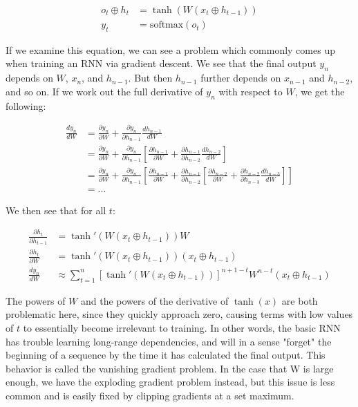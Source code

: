 \begin{align}
    o_t\oplus h_t&=\tanh(W(x_t\oplus h_{t-1})) \\
    y_t&=\text{softmax}(o_t)
\end{align}

If we examine this equation, we can see a problem which commonly comes up when training an RNN via gradient descent. We see that the final output $y_n$ depends on $W$, $x_n$, and $h_{n-1}$. But then $h_{n-1}$ further depends on $x_{n-1}$ and $h_{n-2}$, and so on. If we work out the full derivative of $y_n$ with respect to $W$, we get the following:

\begin{align}
    \frac{dy_n}{dW}&=\frac{\partial y_n}{\partial W} + \frac{\partial y_n}{\partial h_{n-1}}\frac{dh_{n-1}}{dW} \\
    &=\frac{\partial y_n}{\partial W} + \frac{\partial y_n}{\partial h_{n-1}}[\frac{\partial h_{n-1}}{\partial W} + \frac{\partial h_{n-1}}{\partial h_{n-2}}\frac{dh_{n-2}}{dW}] \\
    &=\frac{\partial y_n}{\partial W} + \frac{\partial y_n}{\partial h_{n-1}}[\frac{\partial h_{n-1}}{\partial W} + \frac{\partial h_{n-1}}{\partial h_{n-2}}[
    \frac{\partial h_{n-2}}{\partial W} + \frac{\partial h_{n-2}}{\partial h_{n-3}}\frac{dh_{n-3}}{dW}
    ]] \\
    &=... \nonumber
\end{align}

We then see that for all $t$:

\begin{align}
    \frac{\partial h_t}{\partial h_{t-1}} &= \tanh'(W(x_t\oplus h_{t-1}))W \\
    \frac{\partial h_t}{\partial W} &= \tanh'(W(x_t\oplus h_{t-1}))(x_t\oplus h_{t-1}) \\
    \frac{dy_n}{dW} &\approx \sum_{t=1}^{n} [\tanh'(W(x_t\oplus h_{t-1}))]^{n+1-t}W^{n-t}(x_t\oplus h_{t-1})
\end{align}

The powers of $W$ and the powers of the derivative of $\tanh(x)$ are both problematic here, since they quickly approach zero, causing terms with low values of $t$ to essentially become irrelevant to training. In other words, the basic RNN has trouble learning long-range dependencies, and will in a sense "forget" the beginning of a sequence by the time it has calculated the final output. This behavior is called the vanishing gradient problem. In the case that W is large enough, we have the exploding gradient problem instead, but this issue is less common and is easily fixed by clipping gradients at a set maximum.

